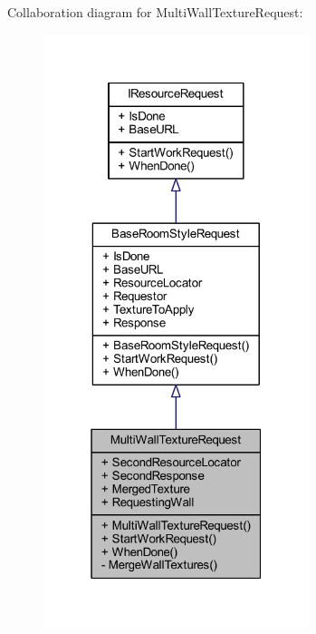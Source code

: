 Collaboration diagram for Multi\+Wall\+Texture\+Request\+:
\nopagebreak
\begin{figure}[H]
\begin{center}
\leavevmode
\includegraphics[width=220pt]{class_multi_wall_texture_request__coll__graph}
\end{center}
\end{figure}
